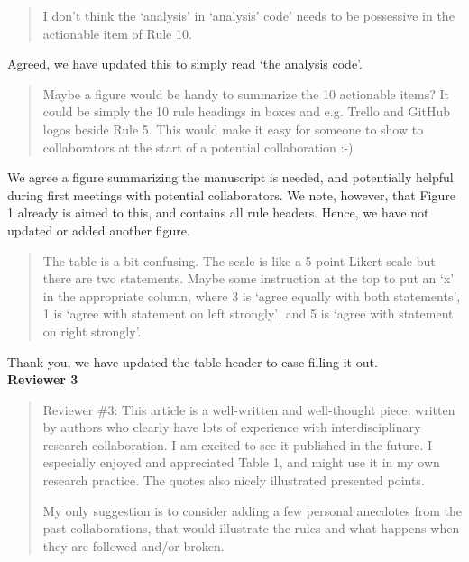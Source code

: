 \documentclass[a4paper]{article}
\begin{document}
\begin{quote}
    I don’t think the `analysis' in `analysis' code' needs to be possessive in the actionable item of Rule 10.

\end{quote}

Agreed, we have updated this to simply read `the analysis code'.

\begin{quote}
    
Maybe a figure would be handy to summarize the 10 actionable items? It could be simply the 10 rule headings in boxes and e.g. Trello and GitHub logos beside Rule 5. This would make it easy for someone to show to collaborators at the start of a potential collaboration :-)

\end{quote}

We agree a figure summarizing the manuscript is needed, and potentially helpful during first meetings with potential collaborators. We note, however, that Figure 1 already is aimed to this, and contains all rule headers. Hence, we have not updated or added another figure.

\begin{quote}
    
The table is a bit confusing. The scale is like a 5 point Likert scale but there are two statements. Maybe some instruction at the top to put an `x' in the appropriate column, where 3 is `agree equally with both statements', 1 is `agree with statement on left strongly', and 5 is `agree with statement on right strongly'.

\end{quote}

Thank you, we have updated the table header to ease filling it out.\\

\noindent \textbf{Reviewer 3}

\begin{quote}
    Reviewer \#3: This article is a well-written and well-thought piece, written by authors who clearly have lots of experience with interdisciplinary research collaboration. I am excited to see it published in the future. I especially enjoyed and appreciated Table 1, and might use it in my own research practice. The quotes also nicely illustrated presented points.

My only suggestion is to consider adding a few personal anecdotes from the past collaborations, that would illustrate the rules and what happens when they are followed and/or broken.
\end{quote}
\end{document}
